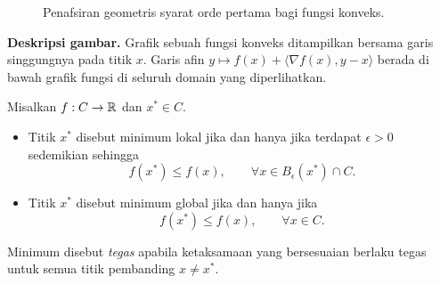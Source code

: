 \begin{figure}
    \centering
        \caption{Penafsiran geometris syarat orde pertama bagi fungsi konveks.}
        \label{convexity:fig:gradients}
\end{figure}

\noindent\textbf{Deskripsi gambar.} Grafik sebuah fungsi konveks ditampilkan bersama garis singgungnya pada titik $x$. Garis afin $y\mapsto f(x)+\langle\nabla f(x),y-x\rangle$ berada di bawah grafik fungsi di seluruh domain yang diperlihatkan.

\begin{defn}[Minimum]
    Misalkan $f:C\rightarrow\mathbb{R}$ dan $x^*\in C$.
    \begin{itemize}
        \item Titik $x^*$ disebut minimum lokal jika dan hanya jika terdapat $\epsilon>0$ sedemikian sehingga
        \[
            f(x^*)\leq f(x),\qquad \forall x\in B_\epsilon(x^*)\cap C.
        \]
        \item Titik $x^*$ disebut minimum global jika dan hanya jika
        \[
            f(x^*)\leq f(x),\qquad \forall x\in C.
        \]
    \end{itemize}
    Minimum disebut \emph{tegas} apabila ketaksamaan yang bersesuaian berlaku tegas untuk semua titik pembanding $x\neq x^*$.
\end{defn}

